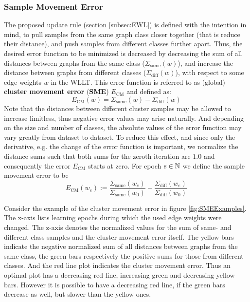 	\subsubsection{Sample Movement Error} \label{subsec:method_sme}
		
		The proposed update rule (section \ref{subsec:EWL}) is defined with the intention in mind, to pull samples from the same graph class closer together (that is reduce their distance), and push samples from different classes further apart.
		Thus, the desired error function to be minimized is decreased by decreasing the sum of all distances between graphs from the same class ($\Sigma_{\text{same}}(w)$), and increase the distance between graphs from different classes ($\Sigma_{\text{diff}}(w)$), with respect to some edge weights $w$ in the WLLT.
		This error function is referred to as (global) \textbf{cluster movement error} (\textbf{SME}) $E_{\text{CM}}$ and defined as:
		\[ E_{\text{CM}}(w) = \Sigma_{\text{same}}(w)  - \Sigma_{\text{diff}}(w) \]
		Note that the distances between different cluster samples may be allowed to increase limitless, thus negative error values may arise naturally.
		And depending on the size and number of classes, the absolute values of the error function may vary greatly from dataset to dataset.		
		To reduce this effect, and since only the derivative, e.g. the change of the error function is important, we normalize the distance sums such that both sums for the zeroth iteration are $1.0$ and consequently the error $E_{\text{CM}}$ starts at zero.
		For epoch $e\in\mathbb{N}$ we define the sample movement error to be
		\[ E_{\text{CM}}(w_e) := \frac{ \Sigma_{\text{same}}(w_e) }{ \Sigma_{\text{same}}(w_0) } - \frac{ \Sigma_{\text{diff}}(w_e) }{ \Sigma_{\text{diff}}(w_0) } \]
		
		Consider the example of the cluster movement error in figure \ref{fig:SMEExamples}.
		The x-axis lists learning epochs during which the used edge weights were changed.
		The z-axis denotes the normalized values for the sum of same- and different class samples and the cluster movement error itself.
		The yellow bars indicate the negative normalized sum of all distances between graphs from the same class, the green bars respectively the positive sums for those from different classes.
		And the red line plot indicates the cluster movement error.
		Thus an optimal plot has a decreasing red line, increasing green and decreasing yellow bars. 
		However it is possible to have a decreasing red line, if the green bars decrease as well, but slower than the yellow ones.		
				
